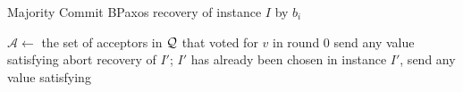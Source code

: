 \begin{algorithm}[ht]
  \caption{Majority Commit BPaxos recovery of instance $I$ by $b_i$}%
  \begin{algorithmic}[1]
    \makeatletter
    \setcounter{ALG@line}{4}
    \makeatother
    \State $\mathcal{A} \gets$ the set of acceptors in $\mathcal{Q}$ that voted for
           $v$ in round $0$
      \State send any value satisfying 
    \EndIf{}
        \State abort recovery of $I'$; $I'$ has already been chosen
      \Else{}
        \State in instance $I'$, send any value satisfying
      \EndIf{}
    \EndIf{}
  \end{algorithmic}
\end{algorithm}
